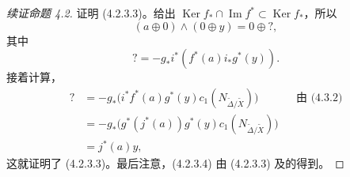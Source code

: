 \begin{proof}[续证命题 4.2]
证明 (4.2.3.3)。给出 $\operatorname{Ker}f_*\cap\operatorname{Im}f^*\subset\operatorname{Ker}f_*$，所以
\[
 (a\oplus0)\wedge(0\oplus y)=0\oplus?,
\]
其中
\[
 ?=-g_*i^*(f^*(a)i_*g^*(y)).\tag{4.3.3}
\]
接着计算，
\[
\begin{aligned}
?&=-g_*\bigl(i^*f^*(a)g^*(y)c_1(N_{\widetilde\Delta/\widetilde X})\bigr)&&\text{由 (4.3.2)}\\
 &=-g_*\bigl(g^*(j^*(a))g^*(y)c_1(N_{\widetilde\Delta/\widetilde X})\bigr)\\
 &=j^*(a)y,
\end{aligned}
\]
这就证明了 (4.2.3.3)。最后注意，(4.2.3.4) 由 (4.2.3.3) 及的得到。
\end{proof}
